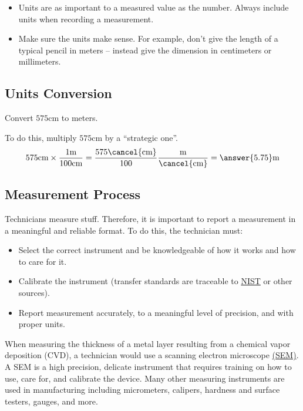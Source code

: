 \documentclass{ximera}
\begin{document}
\begin{warning}
\begin{itemize}
    \item Units are as important to a measured value as the number. Always include units when recording a measurement. 
\item Make sure the units make sense. For example, don’t give the length of a typical pencil in meters -- instead give the dimension in centimeters or millimeters.
\end{itemize}
\end{warning}

 \subsection*{Units Conversion}

 \begin{example}\label{ex:unitConversion}
     Convert $575$cm to meters. 
     \begin{explanation}
     To do this, multiply $575$cm by a “strategic one”.  
$$575\text{cm}\times \frac{1\text{m}}{100\text{cm}}=\frac{575\cancel{\text{cm}}}{100}\frac{\text{m}}{\cancel{\text{cm}}}=\answer{5.75}\text{m}$$
     \end{explanation}
 \end{example}

 \subsection*{Measurement Process}
 Technicians measure stuff. Therefore, it is important to report a measurement in a meaningful and reliable format.
To do this, the technician must:
\begin{itemize}
\item Select the correct instrument and be knowledgeable of how it works and how to care for it.
\item Calibrate the instrument (transfer standards are traceable to \href{https://www.nist.gov/}{NIST} or other sources).
\item Report  measurement accurately, to a meaningful level of precision, and with proper units.
\end{itemize}

When measuring the thickness of a metal layer resulting from a chemical vapor deposition (CVD), a technician would use a scanning electron microscope \href{https://www.nist.gov/news-events/news/2023/05/leveling-sem-measurements-chip-manufacturing}{(SEM)}.  A SEM is a high precision, delicate instrument that requires training on how to use, care for, and calibrate the device. Many other measuring instruments are used in manufacturing including micrometers, calipers, hardness and surface testers, gauges, and more. 
\end{document}
